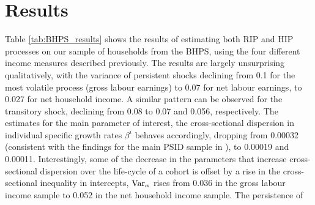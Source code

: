 \section{Results}
Table \ref{tab:BHPS_results} shows the results of estimating both RIP and HIP
processes on our sample of households from the BHPS, using the four different
income measures described previously. The results are largely unsurprising 
qualitatively, with the variance of persistent shocks declining from 0.1 for
the most volatile process (gross labour earnings) to 0.07 for net labour earnings,
to 0.027 for net household income. A similar pattern can be observed for the 
transitory shock, declining from 0.08 to 0.07 and 0.056, respectively. The 
estimates for the main parameter of interest, the cross-sectional dispersion 
in individual specific growth rates $\beta^i$ behaves accordingly, dropping from 
0.00032 (consistent with the findings for the main PSID sample in 
\citet{Guvenen2009}), to 0.00019 and 0.00011. Interestingly, some of the decrease
in the parameters that increase cross-sectional dispersion over the life-cycle
of a cohort is offset by a rise in the cross-sectional inequality in intercepts, 
$\mbox{Var}_{\alpha}$ rises from 0.036 in the gross labour income sample to 0.052 in 
the net household income sample. The persistence of 

